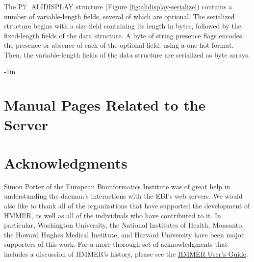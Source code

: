\documentclass[notoc,justified,openany]{tufte-book}    %
\begin{document}
The {P7\_ALIDISPLAY} structure (Figure \ref{fig:alidisplay-serialize}) contains a number of variable-length fields, several of which are optional.  The serialized structure begins with a size field containing its length in bytes, followed by the fixed-length fields of the data structure.  A byte of string presence flags encodes the presence or absence of each of the optional field, using a one-hot format.  Then, the variable-length fields of the data structure are serialized as byte arrays.

\begin{adjustwidth}{}{-1in}   
\chapter{Manual Pages Related to the Server}

\end{adjustwidth}



\chapter{Acknowledgments}
Simon Potter of the European Bioinformatics Institute was of great help in understanding the daemon's interactions with the EBI's web servers.  We would also like to thank all of the organizations that have supported the development of HMMER, as well as all of the individuals who have contributed to it. In particular, Washington University, the National Institutes of Health, Monsanto, the Howard Hughes Medical Institute, and Harvard University have been major supporters of this work.  For a more thorough set of acknowledgments that includes a discussion of HMMER's history, please see the \underline{HMMER User's Guide}.

\label{manualend}

% 
\end{document}
